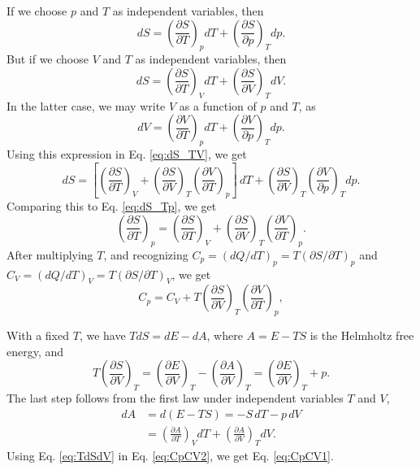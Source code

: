 \documentclass[twocolumn, 10pt]{article}
\numberwithin{equation}{section}
\newenvironment{solution}[1][\empty]
{\par\medskip
  \textbf{\ifx\empty#1{Solution.}\relax\else{#1}\fi} \ignorespaces}
{\medskip}
\begin{document}
\begin{solution}
If we choose $p$ and $T$ as independent variables, then
\begin{equation}
  dS =
  \left( \frac{ \partial S } { \partial T } \right)_p dT
  +
  \left( \frac{ \partial S } { \partial p } \right)_T dp.
  \label{eq:dS_Tp}
\end{equation}
But if we choose $V$ and $T$ as independent variables, then
\begin{equation}
  dS =
  \left( \frac{ \partial S } { \partial T } \right)_V dT
  +
  \left( \frac{ \partial S } { \partial V } \right)_T dV.
  \label{eq:dS_TV}
\end{equation}
In the latter case,
we may write $V$ as a function of $p$ and $T$, as
$$
  dV =
  \left( \frac{ \partial V } { \partial T } \right)_p dT
  +
  \left( \frac{ \partial V } { \partial p } \right)_T dp.
$$
Using this expression in Eq. \eqref{eq:dS_TV}, we get
$$
  dS =
  \left[
  \left( \frac{ \partial S } { \partial T } \right)_V
  +
  \left( \frac{ \partial S } { \partial V } \right)_T
  \left( \frac{ \partial V } { \partial T } \right)_p
  \right] \, dT
  +
  \left( \frac{ \partial S } { \partial V } \right)_T
  \left( \frac{ \partial V } { \partial p } \right)_T dp.
$$
Comparing this to Eq. \eqref{eq:dS_Tp}, we get
%
\begin{equation}
  \left( \frac{ \partial S } { \partial T } \right)_p
  =
  \left( \frac{ \partial S } { \partial T } \right)_V
  +
  \left( \frac{ \partial S } { \partial V } \right)_T
  \left( \frac{ \partial V } { \partial T } \right)_p.
  \label{eq:dSdT_pV}
\end{equation}
%
After multiplying $T$,
  and recognizing
  $C_p = (dQ/dT)_p = T (\partial S/\partial T)_p$
  and
  $C_V = (dQ/dT)_V = T (\partial S/\partial T)_V$,
  we get
\begin{equation}
  C_p
  =
  C_V
  +
  T \left( \frac{ \partial S } { \partial V } \right)_T
  \left( \frac{ \partial V } { \partial T } \right)_p,
  \label{eq:CpCV2}
\end{equation}

With a fixed $T$, we have $T dS = dE - dA$,
where $A = E - TS$ is the Helmholtz free energy, and
\begin{equation}
  T \left( \frac{ \partial S } { \partial V } \right)_T
  =
  \left( \frac{ \partial E } { \partial V } \right)_T
  -
  \left( \frac{ \partial A } { \partial V } \right)_T
  =
  \left( \frac{ \partial E } { \partial V } \right)_T
  +p.
  \label{eq:TdSdV}
\end{equation}
The last step follows from
the first law under independent variables $T$ and $V$,
\begin{align*}
  dA
  &= d(E - TS) = -S \, dT - p \, dV
  \\
  &=
  \left( \frac{ \partial A } { \partial T } \right)_V dT
  +
  \left( \frac{ \partial A } { \partial V } \right)_T dV
  .
\end{align*}
Using Eq. \eqref{eq:TdSdV} in Eq. \eqref{eq:CpCV2},
we get Eq. \eqref{eq:CpCV1}.


\end{solution}
\end{document}

